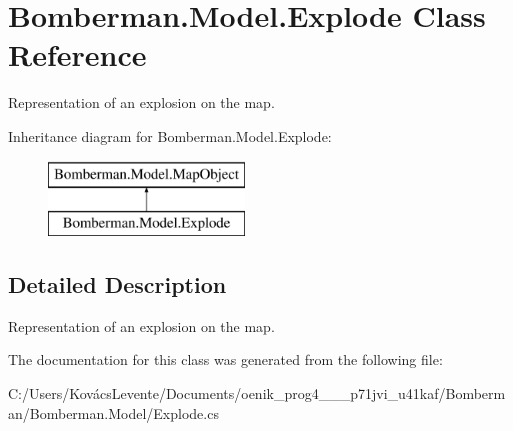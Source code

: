\hypertarget{class_bomberman_1_1_model_1_1_explode}{}\section{Bomberman.\+Model.\+Explode Class Reference}
\label{class_bomberman_1_1_model_1_1_explode}


Representation of an explosion on the map.  


Inheritance diagram for Bomberman.\+Model.\+Explode\+:\begin{figure}[H]
\begin{center}
\leavevmode
\includegraphics[height=2.000000cm]{class_bomberman_1_1_model_1_1_explode}
\end{center}
\end{figure}


\subsection{Detailed Description}
Representation of an explosion on the map. 



The documentation for this class was generated from the following file\+:\begin{DoxyCompactItemize}
\item 
C\+:/\+Users/\+Kovács\+Levente/\+Documents/oenik\+\_\+prog4\+\_\+\_\+\_\+p71jvi\+\_\+u41kaf/\+Bomberman/\+Bomberman.\+Model/Explode.\+cs\end{DoxyCompactItemize}
